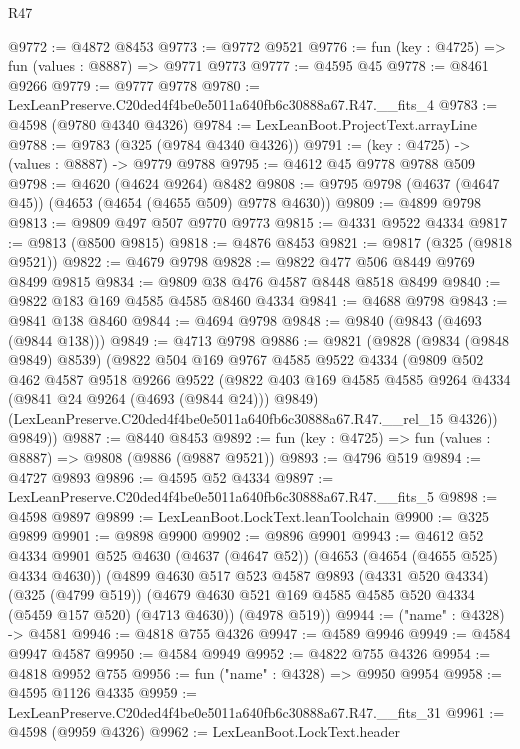 \begin{lexlean}{R47}
\begin{coremodule}
@9772 := @4872 @8453
@9773 := @9772 @9521
@9776 := fun (key : @4725) => fun (values : @8887) => @9771 @9773
@9777 := @4595 @45
@9778 := @8461 @9266
@9779 := @9777 @9778
@9780 := LexLeanPreserve.C20ded4f4be0e5011a640fb6c30888a67.R47.__fits_4
@9783 := @4598 (@9780 @4340 @4326)
@9784 := LexLeanBoot.ProjectText.arrayLine
@9788 := @9783 (@325 (@9784 @4340 @4326))
@9791 := (key : @4725) -> (values : @8887) -> @9779 @9788
@9795 := @4612 @45 @9778 @9788 @509
@9798 := @4620 (@4624 @9264) @8482
@9808 := @9795 @9798 (@4637 (@4647 @45)) (@4653 (@4654 (@4655 @509) @9778 @4630))
@9809 := @4899 @9798
@9813 := @9809 @497 @507 @9770 @9773
@9815 := @4331 @9522 @4334
@9817 := @9813 (@8500 @9815)
@9818 := @4876 @8453
@9821 := @9817 (@325 (@9818 @9521))
@9822 := @4679 @9798
@9828 := @9822 @477 @506 @8449 @9769 @8499 @9815
@9834 := @9809 @38 @476 @4587 @8448 @8518 @8499
@9840 := @9822 @183 @169 @4585 @4585 @8460 @4334
@9841 := @4688 @9798
@9843 := @9841 @138 @8460
@9844 := @4694 @9798
@9848 := @9840 (@9843 (@4693 (@9844 @138)))
@9849 := @4713 @9798
@9886 := @9821
    (@9828
      (@9834 (@9848 @9849) @8539)
      (@9822
        @504
        @169
        @9767
        @4585
        @9522
        @4334
        (@9809
          @502
          @462
          @4587
          @9518
          @9266
          @9522
          (@9822 @403 @169 @4585 @4585 @9264 @4334 (@9841 @24 @9264 (@4693 (@9844 @24))) @9849)
          (LexLeanPreserve.C20ded4f4be0e5011a640fb6c30888a67.R47.__rel_15 @4326))
        @9849))
@9887 := @8440 @8453
@9892 := fun (key : @4725) => fun (values : @8887) => @9808 (@9886 (@9887 @9521))
@9893 := @4796 @519
@9894 := @4727 @9893
@9896 := @4595 @52 @4334
@9897 := LexLeanPreserve.C20ded4f4be0e5011a640fb6c30888a67.R47.__fits_5
@9898 := @4598 @9897
@9899 := LexLeanBoot.LockText.leanToolchain
@9900 := @325 @9899
@9901 := @9898 @9900
@9902 := @9896 @9901
@9943 := @4612
    @52
    @4334
    @9901
    @525
    @4630
    (@4637 (@4647 @52))
    (@4653 (@4654 (@4655 @525) @4334 @4630))
    (@4899
      @4630
      @517
      @523
      @4587
      @9893
      (@4331 @520 @4334)
      (@325 (@4799 @519))
      (@4679 @4630 @521 @169 @4585 @4585 @520 @4334 (@5459 @157 @520) (@4713 @4630))
      (@4978 @519))
@9944 := ("name" : @4328) -> @4581
@9946 := @4818 @755 @4326
@9947 := @4589 @9946
@9949 := @4584 @9947 @4587
@9950 := @4584 @9949
@9952 := @4822 @755 @4326
@9954 := @4818 @9952 @755
@9956 := fun ("name" : @4328) => @9950 @9954
@9958 := @4595 @1126 @4335
@9959 := LexLeanPreserve.C20ded4f4be0e5011a640fb6c30888a67.R47.__fits_31
@9961 := @4598 (@9959 @4326)
@9962 := LexLeanBoot.LockText.header

\end{coremodule}
\end{lexlean}
